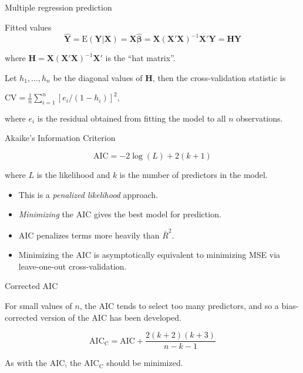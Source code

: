 \documentclass[14pt]{beamer}
\makeatletter
\def\biz{\begin{itemize}[<+-| alert@+>]}
\def\eiz{\end{itemize}}
\makeatother
\begin{document}
\begin{frame}{Multiple regression prediction}


\begin{block}{Fitted values}\vspace*{-0.2cm}
\[
\hat{\bm{Y}} =
\text{E}(\bm{Y}|\bm{X}) =
\bm{X}\hat{\bm{\beta}} = \bm{X}(\bm{X}'\bm{X})^{-1}\bm{X}'\bm{Y} = \bm{H}\bm{Y}
\]
\end{block}
where $\bm{H} = \bm{X}(\bm{X}'\bm{X})^{-1}\bm{X}'$ is the ``hat matrix''.\pause


Let $h_1,\dots,h_n$ be the diagonal values of $\bm{H}$, then the cross-validation statistic is
\begin{block}{}
\centerline{$\displaystyle
\text{CV} = \frac1n\sum_{i=1}^n[e_i/(1-h_i)]^2,$}
\end{block}
where $e_i$ is the residual obtained from fitting the model to all $n$ observations.


\end{frame}

\begin{frame}{Akaike's Information Criterion}

\begin{block}{}
\[
\text{AIC} = -2\log(L) + 2(k+1)
\]
\end{block}
where $L$ is the likelihood and $k$ is the number of predictors in the model.\pause

\biz
\item This is a \emph{penalized likelihood} approach.

\item \emph{Minimizing} the AIC gives the best model for prediction.

\item AIC penalizes terms more heavily than $\bar{R}^2$.

\item Minimizing the AIC is asymptotically equivalent to minimizing MSE via leave-one-out cross-validation.
\eiz

\end{frame}

\begin{frame}{Corrected AIC}

For small values of $n$, the AIC tends to select too many predictors, and so a bias-corrected version of the AIC has been developed.
\begin{block}{}
\[
\text{AIC}_{\text{C}} = \text{AIC} + \frac{2(k+2)(k+3)}{n-k-1}
\]
\end{block}
As with the AIC, the AIC$_{\text{C}}$ should be minimized.
\end{frame}
\end{document}
